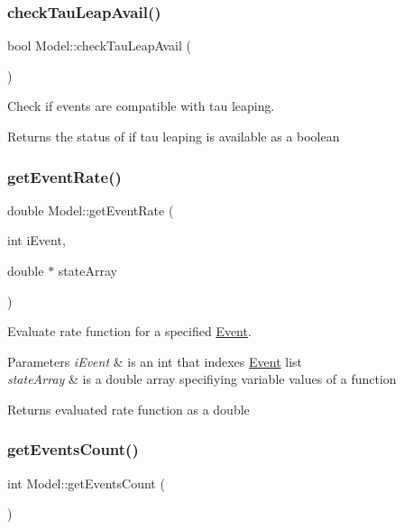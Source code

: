\subsubsection{\texorpdfstring{check\+Tau\+Leap\+Avail()}{checkTauLeapAvail()}}
{\footnotesize\ttfamily bool Model\+::check\+Tau\+Leap\+Avail (\begin{DoxyParamCaption}{ }\end{DoxyParamCaption})}



Check if events are compatible with tau leaping. 

\begin{DoxyReturn}{Returns}
the status of if tau leaping is available as a boolean 
\end{DoxyReturn}
\mbox{\label{class_model_a2909caddddccca90faaae708e68226ad}} 
\subsubsection{\texorpdfstring{get\+Event\+Rate()}{getEventRate()}}
{\footnotesize\ttfamily double Model\+::get\+Event\+Rate (\begin{DoxyParamCaption}\item[{int}]{i\+Event,  }\item[{double $\ast$}]{state\+Array }\end{DoxyParamCaption})}



Evaluate rate function for a specified \hyperlink{class_event}{Event}. 


\begin{DoxyParams}{Parameters}
{\em i\+Event} & is an int that indexes \hyperlink{class_event}{Event} list \\
\hline
{\em state\+Array} & is a double array specifiying variable values of a function \\
\hline
\end{DoxyParams}
\begin{DoxyReturn}{Returns}
evaluated rate function as a double 
\end{DoxyReturn}
\mbox{\label{class_model_adc48dad5a02caa940aaffee7e8377682}} 
\subsubsection{\texorpdfstring{get\+Events\+Count()}{getEventsCount()}}
{\footnotesize\ttfamily int Model\+::get\+Events\+Count (\begin{DoxyParamCaption}{ }\end{DoxyParamCaption})}



